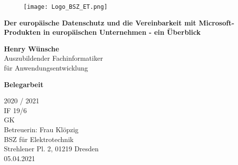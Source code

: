 \begin{titlepage}
    \begin{center}
        \begin{figure}[hbp]
            \begin{center}
                \texttt{[image: Logo\_BSZ\_ET.png]}
            \end{center}
        \end{figure}
        \vspace*{1cm}
        {\huge\textbf{Der europäische Datenschutz und die Vereinbarkeit mit Microsoft-Produkten in europäischen Unternehmen - ein Überblick}}

        \vspace{2cm}

            {\huge\textbf{Henry Wünsche}} \\
            Auszubildender Fachinformatiker \\ für Anwendungsentwicklung

        \vfill
        {\huge\textbf{Belegarbeit}}

        \vspace{1cm}
        {\Huge 2020 / 2021}\\
        \vspace{0.8cm}
        IF 19/6\\
        GK\\
        Betreuerin: Frau Klöpzig\\
        BSZ für Elektrotechnik\\
        Strehlener Pl. 2, 01219 Dresden\\
        05.04.2021
    \end{center}
\end{titlepage}
\pagebreak
